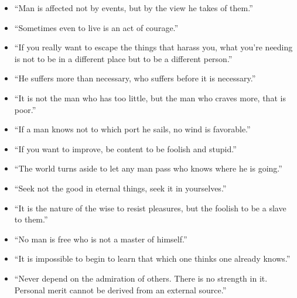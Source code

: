 \documentclass{article}
\begin{document}
\begin{itemize}
        \item “Man is affected not by events, but by the view he takes of them.”
        \item “Sometimes even to live is an act of courage.”
        \item “If you really want to escape the things that harass you, what you’re needing is not to be in a different place but to be a different person.”
        \item “He suffers more than necessary, who suffers before it is necessary.”
        \item “It is not the man who has too little, but the man who craves more, that is poor.”
        \item “If a man knows not to which port he sails, no wind is favorable.”
        \item “If you want to improve, be content to be foolish and stupid.”
        \item “The world turns aside to let any man pass who knows where he is going.”
        \item “Seek not the good in eternal things, seek it in yourselves.”
        \item “It is the nature of the wise to resist pleasures, but the foolish to be a slave to them.”
        \item “No man is free who is not a master of himself.”
        \item “It is impossible to begin to learn that which one thinks one already knows.”
        \item “Never depend on the admiration of others. There is no strength in it. Personal merit cannot be derived from an external source.”
    \end{itemize}
\end{document}
